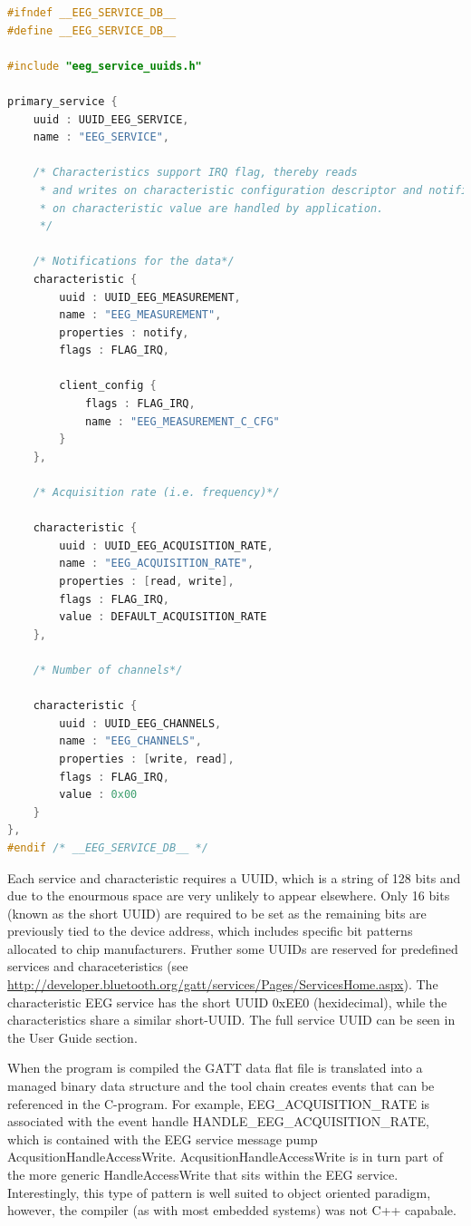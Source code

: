 \documentclass[]{article}
\begin{document}
\begin{lstlisting}[language=C, caption=GATT database entry for EEG characteristic,label={lst:eeggatt}]
#ifndef __EEG_SERVICE_DB__
#define __EEG_SERVICE_DB__

#include "eeg_service_uuids.h"

primary_service {
    uuid : UUID_EEG_SERVICE,
    name : "EEG_SERVICE",

    /* Characteristics support IRQ flag, thereby reads 
     * and writes on characteristic configuration descriptor and notifications 
     * on characteristic value are handled by application. 
     */

    /* Notifications for the data*/
    characteristic {
        uuid : UUID_EEG_MEASUREMENT,
        name : "EEG_MEASUREMENT",
        properties : notify,
        flags : FLAG_IRQ,

        client_config {
            flags : FLAG_IRQ,
            name : "EEG_MEASUREMENT_C_CFG"
        }
    },

    /* Acquisition rate (i.e. frequency)*/

    characteristic {
        uuid : UUID_EEG_ACQUISITION_RATE,
        name : "EEG_ACQUISITION_RATE",
        properties : [read, write],
        flags : FLAG_IRQ,
        value : DEFAULT_ACQUISITION_RATE
    },

    /* Number of channels*/

    characteristic {
        uuid : UUID_EEG_CHANNELS,
        name : "EEG_CHANNELS",
        properties : [write, read],
        flags : FLAG_IRQ,
        value : 0x00
    }
},
#endif /* __EEG_SERVICE_DB__ */
\end{lstlisting}

Each service and characteristic requires a \ac{UUID}, which is a string of 128 bits and due to the enourmous space are very unlikely to appear elsewhere. Only 16 bits (known as the short \ac{UUID}) are required to be set as the remaining bits are previously tied to the device address, which includes specific bit patterns allocated to chip manufacturers. Fruther some \ac{UUID}s are reserved for predefined services and characeteristics (see \url{http://developer.bluetooth.org/gatt/services/Pages/ServicesHome.aspx}). The characteristic \ac{EEG} service has the short \ac{UUID} 0xEE0 (hexidecimal), while the characteristics share a similar short-UUID. The full service UUID can be seen in the User Guide section. 

When the program is compiled the GATT data flat file is translated into a managed binary data structure and the tool chain creates events that can be referenced in the C-program. For example, EEG\_ACQUISITION\_RATE is associated with the event handle HANDLE\_EEG\_ACQUISITION\_RATE, which is contained with the EEG service message pump AcqusitionHandleAccessWrite. AcqusitionHandleAccessWrite is in turn part of the more generic HandleAccessWrite that sits within the EEG service. Interestingly, this type of pattern is well suited to object oriented paradigm, however, the compiler (as with most embedded systems) was not C++ capabale. 
\end{document}

